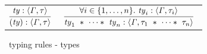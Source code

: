 \documentclass[final]{article}
\begin{document}
\begin{figure}[t]
\begin{small}
\begin{center}
\begin{tabular}{llll}


    \multicolumn{1}{l}{
      $\MEMinferb
      {\MEMtyping{(\METAty)}{\METAityenv}{\METAity}}
      {\MEMtyping{\METAty}{\METAityenv}{\METAity}}$
    }

    &

    \multicolumn{3}{l}{
      $\MEMinferb
      {\MEMtyping{\CONStuptyn{\METAty_1}{\METAty_n}}{\METAityenv}{\CONStuptyn{\METAity_1}{\METAity_n}}}
      {\forallexp{i\in\{1,\dots,n\}}{\MEMtyping{\METAty_i}{\METAityenv}{\METAity_i}}}$
    }
  \end{tabular}
\end{center}
\caption{\eml\ typing rules - types}
\label{fig:typing-rules-types}
\end{small}
\end{figure}
\end{document}
